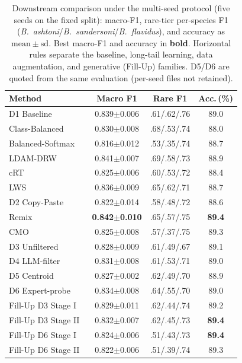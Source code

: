 \documentclass[runningheads]{llncs}
\begin{document}
\begin{table}[t]
  \caption{Downstream comparison under the multi-seed protocol (five
  seeds on the fixed split): macro-F1, rare-tier per-species F1
  (\emph{B.~ashtoni}/\emph{B.~sandersoni}/\emph{B.~flavidus}), and accuracy as
  $\mathrm{mean}\pm\mathrm{sd}$. Best macro-F1 and accuracy in
  \textbf{bold}. Horizontal rules separate the baseline, long-tail
  learning, data augmentation, and generative (Fill-Up) families. D5/D6
  are quoted from the same evaluation (per-seed files not retained).}
  \label{tab:baselines}
  \centering
  \setlength{\tabcolsep}{6pt}
  \begin{tabular}{@{}l c c c@{}}
    \toprule
    Method & Macro F1 & Rare F1 & Acc.\,(\%) \\
    \midrule
    D1 Baseline~\cite{he_deep_2015} & 0.839$\pm$0.006 & .61/.62/.76 & 89.0 \\
    \midrule
    Class-Balanced~\cite{cui_class-balanced_2019} & 0.830$\pm$0.008 & .68/.53/.74 & 88.0 \\
    Balanced-Softmax~\cite{ren_balanced_2020} & 0.816$\pm$0.012 & .53/.35/.74 & 88.7 \\
    LDAM-DRW~\cite{cao_learning_2019}        & 0.841$\pm$0.007 & .69/.58/.73 & 88.9 \\
    cRT~\cite{kang_decoupling_2020}          & 0.825$\pm$0.006 & .60/.53/.72 & 88.4 \\
    LWS~\cite{kang_decoupling_2020}          & 0.836$\pm$0.009 & .65/.62/.71 & 88.7 \\
    \midrule
    D2 Copy-Paste~\cite{ghiasi_simple_2021} & 0.822$\pm$0.014 & .58/.48/.72 & 88.6 \\
    Remix~\cite{chou_remix_2020}             & \textbf{0.842$\pm$0.010} & .65/.57/.75 & \textbf{89.4} \\
    CMO~\cite{park_majority_2022}            & 0.825$\pm$0.008 & .57/.37/.75 & 89.3 \\
    \midrule
    D3 Unfiltered        & 0.828$\pm$0.009 & .61/.49/.67 & 89.1 \\
    D4 LLM-filter        & 0.831$\pm$0.008 & .61/.53/.71 & 89.0 \\
    D5 Centroid          & 0.827$\pm$0.002 & .62/.49/.70 & 88.9 \\
    D6 Expert-probe      & 0.834$\pm$0.008 & .64/.55/.70 & 89.0 \\
    Fill-Up D3 Stage I~\cite{shin_fill-up_2023}  & 0.829$\pm$0.011 & .62/.44/.74 & 89.2 \\
    Fill-Up D3 Stage II~\cite{shin_fill-up_2023} & 0.832$\pm$0.007 & .62/.45/.73 & \textbf{89.4} \\
    Fill-Up D6 Stage I~\cite{shin_fill-up_2023}  & 0.824$\pm$0.006 & .51/.43/.73 & \textbf{89.4} \\
    Fill-Up D6 Stage II~\cite{shin_fill-up_2023} & 0.822$\pm$0.006 & .51/.39/.74 & 89.3 \\
    \bottomrule
  \end{tabular}
\end{table}
\end{document}
